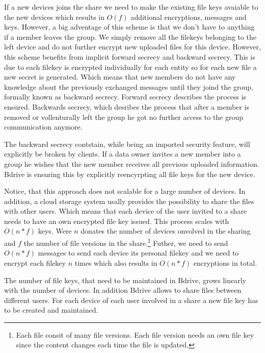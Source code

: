 If a new devices joins the share we need to make the existing file keys avaiable to the new devices which results in $O(f)$ additional encryptions, messages and keys. However, a big adventage of this scheme is that we don't have to anything if a member leaves the group. We simply remove all the filekeys belonging to the left device and do not further encrypt new uploaded files for this device. However, this scheme benefits from implicit forward secrecy and backward secrecy. This is due to each filekey is encrypted individually for each entity so for each new file a new secret is generated. Which means that new members do not have any knowledge about the previously exchanged messages until they joind the group, formally known as backward secrecy. Forward secrecy describes the process is ensured. Backwards secrecy, which desribes the process that after a member is removed or vollenturally left the group he got no further access to the group communication anymore.

The backward secrecy contstain, while being an imported security feature, will explicitly be broken by clients. If a data owner invites a new member into a group he wishes that the new member receives all previous uploaded information. Bdrive is ensuring this by explicitly reencyrpting all file keys for the new device. 

Notice, that this approach does not scalable for a large number of devices. In addition, a cloud storage system usally provides the possibility to share the files with other users. Which means that each device of the user invited to a share needs to have an own encrypted file key issued. This process scales with $O(n * f)$ keys. Were $n$ donates the number of devices onvolved in the sharing and $f$ the number of file versions in the share.\footnote{Each file consit of many file versions. Each file version needs an own file key since the content changes each time the file is updated.} Futher, we need to send $O(n * f)$ messages to send each device its personal filekey and we need to encrypt each filekey $n$ times which also results in $O(n * f)$ encryptions in total. 

The number of file keys, that need to be maintained in Bdrive, grows linearly with the number of devices. In addition Bdrive allows to share files between different users. For each device of each user involved in a share a new file key has to be created and maintained. 

